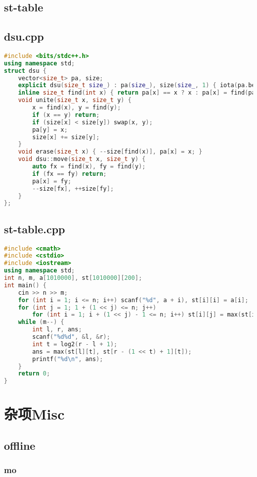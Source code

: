 \documentclass[9pt, a4paper, oneside]{book}
\begin{document}
\section{st-table}
\section{dsu.cpp}
\begin{lstlisting}[language={C++}]
#include <bits/stdc++.h>
using namespace std;
struct dsu {
    vector<size_t> pa, size;
    explicit dsu(size_t size_) : pa(size_), size(size_, 1) { iota(pa.begin(), pa.end(), 0); }
    inline size_t find(int x) { return pa[x] == x ? x : pa[x] = find(pa[x]); }
    void unite(size_t x, size_t y) {
        x = find(x), y = find(y);
        if (x == y) return;
        if (size[x] < size[y]) swap(x, y);
        pa[y] = x;
        size[x] += size[y];
    }
    void erase(size_t x) { --size[find(x)], pa[x] = x; }
    void dsu::move(size_t x, size_t y) {
        auto fx = find(x), fy = find(y);
        if (fx == fy) return;
        pa[x] = fy;
        --size[fx], ++size[fy];
    }
};
\end{lstlisting}
\section{st-table.cpp}
\begin{lstlisting}[language={C++}]
#include <cmath>
#include <cstdio>
#include <iostream>
using namespace std;
int n, m, a[1010000], st[1010000][200];
int main() {
    cin >> n >> m;
    for (int i = 1; i <= n; i++) scanf("%d", a + i), st[i][i] = a[i];
    for (int j = 1; 1 + (1 << j) <= n; j++)
        for (int i = 1; i + (1 << j) - 1 <= n; i++) st[i][j] = max(st[i][j - 1], st[i + (1 << j - 1)][j - 1]);
    while (m--) {
        int l, r, ans;
        scanf("%d%d", &l, &r);
        int t = log2(r - l + 1);
        ans = max(st[l][t], st[r - (1 << t) + 1][t]);
        printf("%d\n", ans);
    }
    return 0;
}\end{lstlisting}
\chapter{杂项Misc}
\section{offline}
\subsection{mo}
\end{document}
